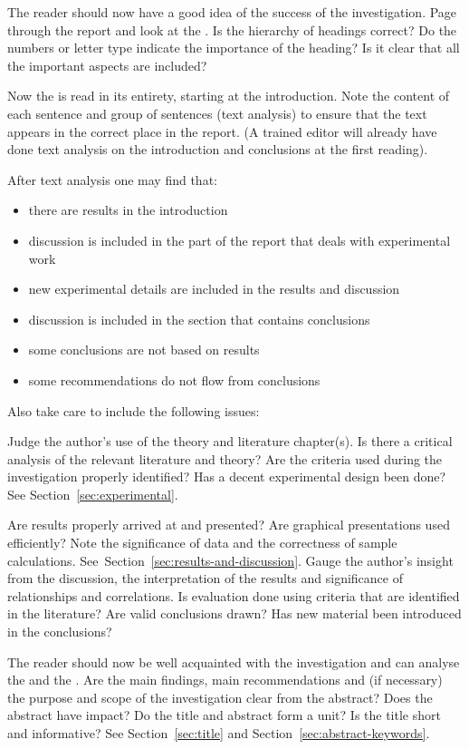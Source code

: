 \documentclass[a5paper, 10pt]{article}
\begin{document}
The reader should now have a good idea of the success of the
investigation.  Page through the report and look at the
.  Is the hierarchy of headings correct?  Do
the numbers or letter type indicate the importance of the heading?  Is
it clear that all the important aspects are included?

Now the  is read in its entirety, starting at the
introduction.  Note the content of each sentence and group of
sentences (text analysis) to ensure that the text appears in the
correct place in the report.  (A trained editor will already have done
text analysis on the introduction and conclusions at the first
reading).

After text analysis one may find that:
\begin{itemize}
\item there are results in the introduction
\item discussion is included in the part of the report that deals with
  experimental work
\item new experimental details are included in the results and discussion
\item discussion is included in the section that contains conclusions
\item some conclusions are not based on results
\item some recommendations do not flow from conclusions
\end{itemize}

Also take care to include the following issues:

Judge the author's use of the theory and literature chapter(s).  Is
there a critical analysis of the relevant literature and theory?  Are
the criteria used during the investigation properly identified?  Has a
decent experimental design been done?  See
Section~\ref{sec:experimental}.

Are results properly arrived at and presented?  Are graphical
presentations used efficiently?  Note the significance of data and the
correctness of sample calculations.  See~Section~\ref{sec:results-and-discussion}.
Gauge the author's insight from the discussion, the interpretation of
the results and significance of relationships and correlations.  Is
evaluation done using criteria that are identified in the literature?
Are valid conclusions drawn?  Has new material been introduced in the
conclusions?

The reader should now be well acquainted with the investigation and
can analyse the  and the .  Are
the main findings, main recommendations and (if necessary) the purpose
and scope of the investigation clear from the abstract?  
Does the abstract have impact?
Do the title and abstract form a unit?  Is the title short and informative?  See
Section~\ref{sec:title} and Section~\ref{sec:abstract-keywords}.
\end{document}
